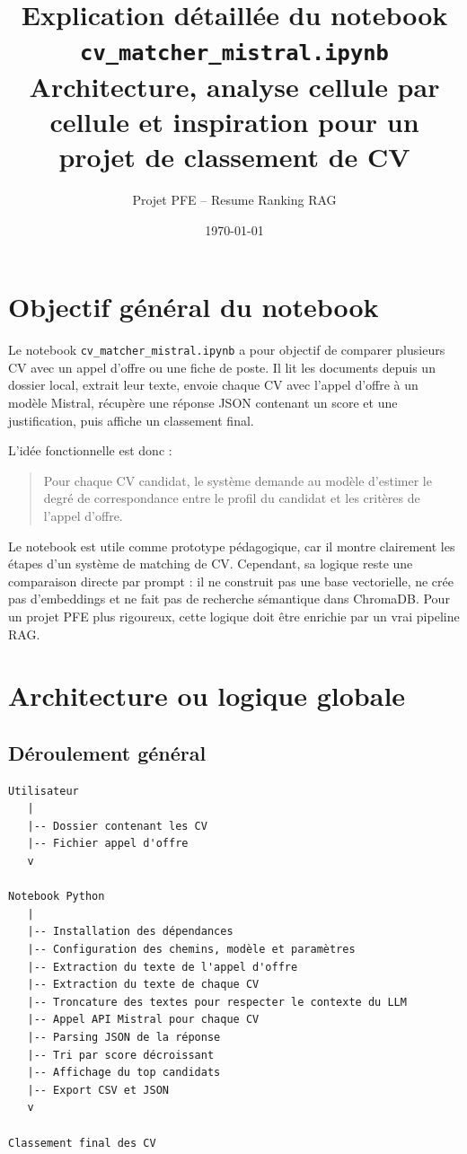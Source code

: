 \documentclass[12pt,a4paper]{article}
\title{\textbf{Explication détaillée du notebook \texttt{cv\_matcher\_mistral.ipynb}}\\
\large Architecture, analyse cellule par cellule et inspiration pour un projet de classement de CV}
\author{Projet PFE -- Resume Ranking RAG}
\date{\today}
\begin{document}
\maketitle

\tableofcontents
\newpage

\section{Objectif général du notebook}

Le notebook \texttt{cv\_matcher\_mistral.ipynb} a pour objectif de comparer plusieurs CV avec un appel d'offre ou une fiche de poste. Il lit les documents depuis un dossier local, extrait leur texte, envoie chaque CV avec l'appel d'offre à un modèle Mistral, récupère une réponse JSON contenant un score et une justification, puis affiche un classement final.

L'idée fonctionnelle est donc :

\begin{quote}
Pour chaque CV candidat, le système demande au modèle d'estimer le degré de correspondance entre le profil du candidat et les critères de l'appel d'offre.
\end{quote}

Le notebook est utile comme prototype pédagogique, car il montre clairement les étapes d'un système de matching de CV. Cependant, sa logique reste une comparaison directe par prompt : il ne construit pas une base vectorielle, ne crée pas d'embeddings et ne fait pas de recherche sémantique dans ChromaDB. Pour un projet PFE plus rigoureux, cette logique doit être enrichie par un vrai pipeline RAG.

\section{Architecture ou logique globale}

\subsection{Déroulement général}

\begin{verbatim}
Utilisateur
   |
   |-- Dossier contenant les CV
   |-- Fichier appel d'offre
   v

Notebook Python
   |
   |-- Installation des dépendances
   |-- Configuration des chemins, modèle et paramètres
   |-- Extraction du texte de l'appel d'offre
   |-- Extraction du texte de chaque CV
   |-- Troncature des textes pour respecter le contexte du LLM
   |-- Appel API Mistral pour chaque CV
   |-- Parsing JSON de la réponse
   |-- Tri par score décroissant
   |-- Affichage du top candidats
   |-- Export CSV et JSON
   v

Classement final des CV
\end{verbatim}
\end{document}
